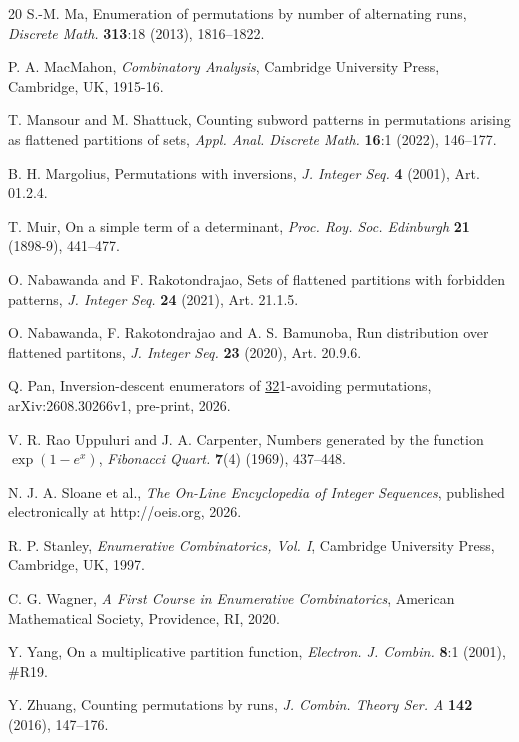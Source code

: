 \documentclass[11pt,a4paper]{article}
\begin{document}
\begin{thebibliography}{20}
S.-M. Ma, Enumeration of permutations by number of alternating runs, \emph{Discrete Math.} {\bf 313}:18 (2013), 1816--1822.

P. A. MacMahon, \emph{Combinatory Analysis}, Cambridge University Press, Cambridge, UK, 1915-16.

T. Mansour and M. Shattuck, Counting subword patterns in permutations arising as flattened partitions of sets,
  \emph{Appl. Anal. Discrete Math.} {\bf 16}:1 (2022), 146--177.

B. H. Margolius, Permutations with inversions, \emph{J. Integer Seq.} {\bf 4} (2001), Art. 01.2.4.

T. Muir, On a simple term of a determinant, \emph{Proc. Roy. Soc. Edinburgh} {\bf 21} (1898-9), 441--477.

O. Nabawanda and F. Rakotondrajao, Sets of flattened partitions with forbidden patterns, \emph{J. Integer Seq.} {\bf 24} (2021), Art. 21.1.5.

O. Nabawanda, F. Rakotondrajao and A. S. Bamunoba, Run distribution over flattened partitons, \emph{J. Integer Seq.} {\bf 23} (2020), Art. 20.9.6.

Q. Pan, Inversion-descent enumerators of \underline{32}1-avoiding permutations, arXiv:2608.30266v1, pre-print, 2026.


V. R. Rao Uppuluri and J. A. Carpenter, Numbers generated by the function $\exp(1-e^x)$, \emph{Fibonacci Quart.} {\bf 7}(4) (1969), 437--448.

N. J. A. Sloane et al., \emph{The On-Line Encyclopedia of Integer Sequences}, published electronically at http://oeis.org, 2026.

R. P. Stanley, {\em Enumerative Combinatorics, Vol. I}, Cambridge University Press, Cambridge, UK, 1997.

C. G. Wagner, \emph{A First Course in Enumerative Combinatorics}, American Mathematical Society, Providence, RI, 2020.

Y. Yang, On a multiplicative partition function, \emph{Electron. J. Combin.} {\bf 8}:1 (2001), \#R19.

Y. Zhuang, Counting permutations by runs, \emph{J. Combin. Theory Ser. A} {\bf 142} (2016), 147--176.


\end{thebibliography}
\end{document}
